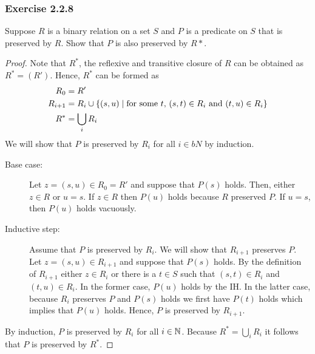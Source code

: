 \subsubsection*{Exercise 2.2.8}
Suppose $R$ is a binary relation on a set $S$ and $P$ is a predicate on $S$ that is preserved by $R$.  Show that $P$ is also preserved by $R*$.
\begin{proof}
Note that $R^*$, the reflexive and transitive closure of $R$ can be obtained as $R^* = (R')$.  Hence, $R^*$ can be formed as 
\begin{align*}
    R_0 &= R'    \\
    R_{i+1} &= R_i \cup \{(s, u)\mid\text{for some $t$, $(s, t) \in R_i$ and $(t, u) \in R_i$}\} \\
    R^* &= \bigcup_i R_i
\end{align*}
We will show that $P$ is preserved by $R_i$ for all $i \in bN$ by induction.
\begin{description}
    \item[Base case:] Let $z = (s, u) \in R_0 = R'$ and suppose that $P(s)$ holds.  Then, either $z \in R$ or $u = s$.  If $z \in R$ then $P(u)$ holds because $R$ preserved $P$.
If $u = s$, then $P(u)$ holds vacuously.
\item[Inductive step:] Assume that $P$ is preserved by $R_i$.  We will show that $R_{i+1}$ 
    preserves $P$. Let $z = (s, u) \in R_{i+1}$ and suppose that $P(s)$ holds.  By the definition of 
    $R_{i+1}$ either $z \in R_i$ or there is a $t \in S$ such that $(s, t) \in R_i$ and $(t, u) \in R_i$.
    In the former case, $P(u)$ holds by the IH.  In the latter case, because $R_i$ preserves $P$ and $P(s)$ holds we first have $P(t)$ holds which implies that $P(u)$ holds.  Hence, $P$ is preserved by $R_{i+1}$.
\end{description}
By induction, $P$ is preserved by $R_i$ for all $i \in \mathbb{N}$.  Because $R^* = \bigcup_i R_i$ it follows that
$P$ is preserved by $R^*$.
\end{proof}

















